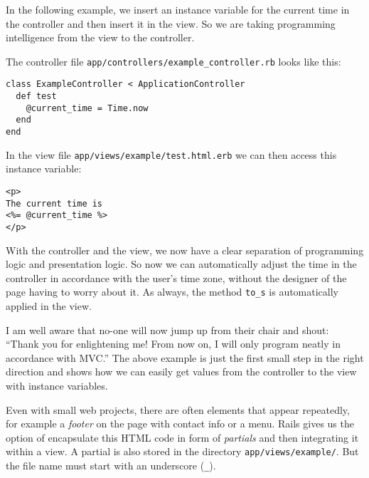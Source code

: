 \documentclass[a4paper]{book}
\begin{document}
In the following example, we insert an instance variable for the current time in the controller and then insert it in the view. So we are taking programming intelligence from the view to the controller.

The controller file \texttt{app/controllers/example\_controller.rb} looks like this:

\begin{shaded}\begin{verbatim}
class ExampleController < ApplicationController
  def test
    @current_time = Time.now
  end
end
\end{verbatim}\end{shaded}

In the view file \texttt{app/views/example/test.html.erb} we can then access this instance variable:

\begin{shaded}\begin{verbatim}
<p>
The current time is
<%= @current_time %>
</p>
\end{verbatim}\end{shaded}

With the controller and the view, we now have a clear separation of programming logic and presentation logic. So now we can automatically adjust the time in the controller in accordance with the user's time zone, without the designer of the page having to worry about it. As always, the method \texttt{to\_s} is automatically applied in the view.

I am well aware that no-one will now jump up from their chair and shout: “Thank you for enlightening me! From now on, I will only program neatly in accordance with MVC.” The above example is just the first small step in the right direction and shows how we can easily get values from the controller to the view with instance variables.


Even with small web projects, there are often elements that appear repeatedly, for example a \emph{footer} on the page with contact info or a menu. Rails gives us the option of encapsulate this HTML code in form of \emph{partials} and then integrating it within a view. A partial is also stored in the directory \texttt{app/views/example/}. But the file name must start with an underscore (\texttt{\_}).
\end{document}
